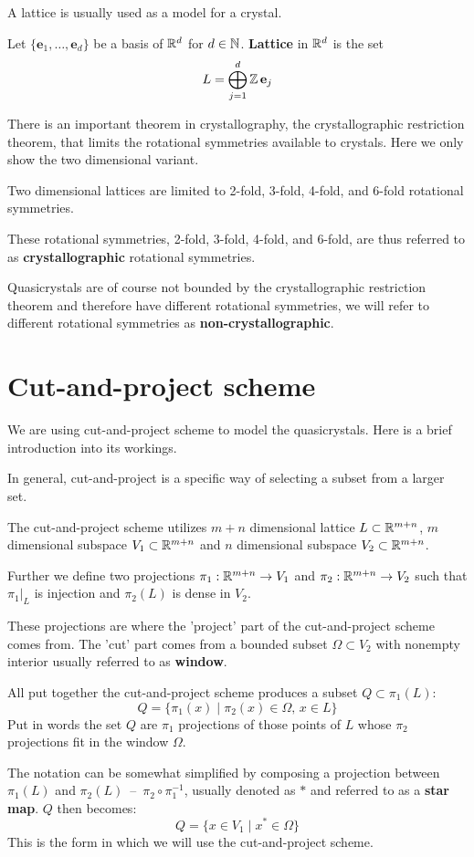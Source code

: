 \documentclass[text.tex]{subfiles}
\begin{document}
A lattice is usually used as a model for a crystal. 

\begin{definition}
Let $\{\mathbf{e}_1, \dots, \mathbf{e}_d\}$ be a basis of $\mathbb{R}^d$ for $d\in\mathbb{N}$. \textbf{Lattice} in $\mathbb{R}^d$ is the set
$$L = \bigoplus^d_{j=1}\mathbb{Z}\, \mathbf{e}_j$$
\end{definition}

There is an important theorem in crystallography, the crystallographic restriction theorem, that limits the rotational symmetries available to crystals. Here we only show the two dimensional variant. 

\begin{theorem}
Two dimensional lattices are limited to 2-fold, 3-fold, 4-fold, and 6-fold rotational symmetries. 
\end{theorem}

These rotational symmetries, 2-fold, 3-fold, 4-fold, and 6-fold, are thus referred to as \textbf{crystallographic} rotational symmetries. 

Quasicrystals are of course not bounded by the crystallographic restriction theorem and therefore have different rotational symmetries, we will refer to different rotational symmetries as \textbf{non-crystallographic}.

\section{Cut-and-project scheme}\label{sec_cutAndProject}%
We are using cut-and-project scheme to model the quasicrystals. Here is a brief introduction into its workings. 

In general, cut-and-project is a specific way of selecting a subset from a larger set.

The cut-and-project scheme utilizes $m+n$ dimensional lattice $L\subset\mathbb{R}^{m+n}$, $m$ dimensional subspace $V_1\subset\mathbb{R}^{m+n}$ and $n$ dimensional subspace $V_2\subset\mathbb{R}^{m+n}$. 

Further we define two projections $\pi_1:\mathbb{R}^{m+n}\rightarrow V_1$ and $\pi_2:\mathbb{R}^{m+n}\rightarrow V_2$ such that $\pi_1|_L$ is injection and $\pi_2(L)$ is dense in $V_2$. 

These projections are where the 'project' part of the cut-and-project scheme comes from. The 'cut' part comes from a bounded subset $\Omega\subset V_2$ with nonempty interior usually referred to as \textbf{window}. 

All put together the cut-and-project scheme produces a subset $Q\subset \pi_1(L)$:
$$Q = \{ \pi_1(x)\; |\; \pi_2(x)\in \Omega,\,  x\in L \}$$
Put in words the set $Q$ are $\pi_1$ projections of those points of $L$ whose $\pi_2$ projections fit in the window $\Omega$. 

The notation can be somewhat simplified by composing a projection between $\pi_1(L)$ and $\pi_2(L)$~--~$\pi_2\circ\pi^{-1}_1$, usually denoted as $\ast$ and referred to as a \textbf{star map}. $Q$ then becomes:
$$Q = \{ x \in V_1\; |\; x^\ast\in \Omega \}$$
This is the form in which we will use the cut-and-project scheme. 
\end{document}
